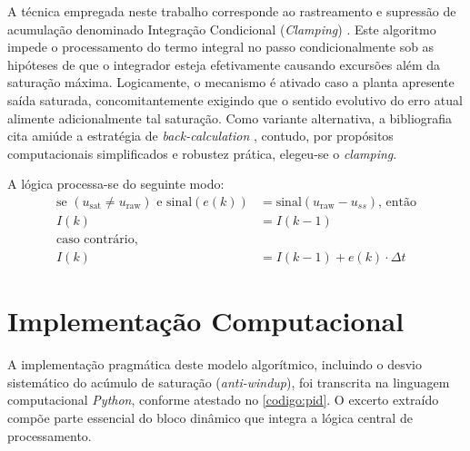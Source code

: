 A técnica empregada neste trabalho corresponde ao rastreamento e supressão de acumulação denominado Integração Condicional (\textit{Clamping}) \cite{Visioli2006}. Este algoritmo impede o processamento do termo integral no passo condicionalmente sob as hipóteses de que o integrador esteja efetivamente causando excursões além da saturação máxima.
Logicamente, o mecanismo é ativado caso a planta apresente saída saturada, concomitantemente exigindo que o sentido evolutivo do erro atual alimente adicionalmente tal saturação. Como variante alternativa, a bibliografia cita amiúde a estratégia de \textit{back-calculation} \cite{Astrom2006}, contudo, por propósitos computacionais simplificados e robustez prática, elegeu-se o \textit{clamping}.

A lógica processa-se do seguinte modo:
\begin{align}
\text{se } \left(u_{\text{sat}} \neq u_{\text{raw}}\right) \text{ e } \text{sinal}(e(k)) &= \text{sinal}(u_{\text{raw}} - u_{ss}) \text{, então} \\ \nonumber
    I(k) &= I(k-1) \\
\text{caso contrário, } \nonumber \\
    I(k) &= I(k-1) + e(k) \cdot \Delta t
\end{align}

\section{Implementação Computacional}
\label{sec:implementacao_pid}

A implementação pragmática deste modelo algorítmico, incluindo o desvio sistemático do acúmulo de saturação (\textit{anti-windup}), foi transcrita na linguagem computacional \textit{Python}, conforme atestado no \autoref{codigo:pid}. O excerto extraído compõe parte essencial do bloco dinâmico que integra a lógica central de processamento.


